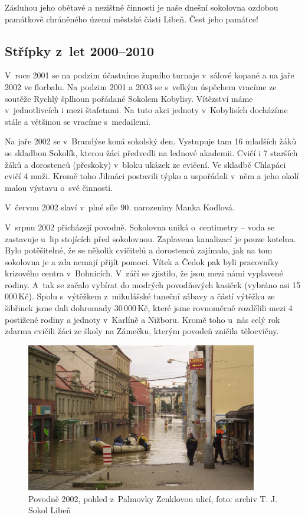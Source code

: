 \documentclass[a5paper, 11pt, twoside]{article}
\begin{document}
Zásluhou jeho obětavé a nezištné činnosti je naše dnešní sokolovna
ozdobou památkově chráněného území městské části Libeň. Čest jeho
památce!

\subsection{Střípky z~let
2000--2010}

V~roce 2001 se na podzim účastníme župního turnaje v~sálové kopané a na
jaře 2002 ve florbalu. Na podzim 2001 a 2003 se s~velkým úspěchem
vracíme ze soutěže Rychlý šplhoun pořádané Sokolem Kobylisy. Vítězství
máme v~jednotlivcích i mezi štafetami. Na tuto akci jednoty v~Kobylisích
docházíme stále a většinou se vracíme s~medailemi.

Na jaře 2002 se v~Brandýse koná sokolský den. Vystupuje tam 16 mladších
žáků se skladbou Sokolík, kterou žáci předvedli na lednové akademii.
Cvičí i 7 starších žáků a dorostenců (přeskoky) v~bloku ukázek ze
cvičení. Ve skladbě Chlapáci cvičí 4 muži. Kromě toho Jilmáci postavili
týpko a uspořádali v~něm a jeho okolí malou výstavu o~své činnosti.

V~červnu 2002 slaví v~plné síle 90. narozeniny Manka Kodlová.

V~srpnu 2002 přicházejí povodně. Sokolovna uniká o~centimetry -- voda se
zastavuje u~lip stojících před sokolovnou. Zaplavena kanalizací je pouze
kotelna. Bylo potěšitelné, že se několik cvičitelů a dorostenců
zajímalo, jak na tom sokolovna je a zda nemají přijít pomoci. Vítek a
Čedok pak byli pracovníky krizového centra v~Bohnicích. V~září se
zjistilo, že jsou mezi námi vyplavené rodiny. A~tak se začalo vybírat do
modrých povodňových kasiček (vybráno asi 15\,000\,Kč). Spolu s~výtěžkem
z~mikulášské taneční zábavy a částí výtěžku ze šibřinek jsme dali
dohromady 30\,000\,Kč, které jsme rovnoměrně rozdělili mezi 4 postižené
rodiny a jednoty v~Karlíně a Nižboru. Kromě toho u~nás celý rok zdarma
cvičili žáci ze školy na Zámečku, kterým povodeň zničila tělocvičny.

\begin{figure}[h!]
  \centering 
  \includegraphics[width=0.9\textwidth]{img/47_povodne.jpg}
  \caption*{Povodně 2002, pohled z~Palmovky Zenklovou ulicí, foto: archiv T.
  J. Sokol Libeň}
\end{figure}
\end{document}
